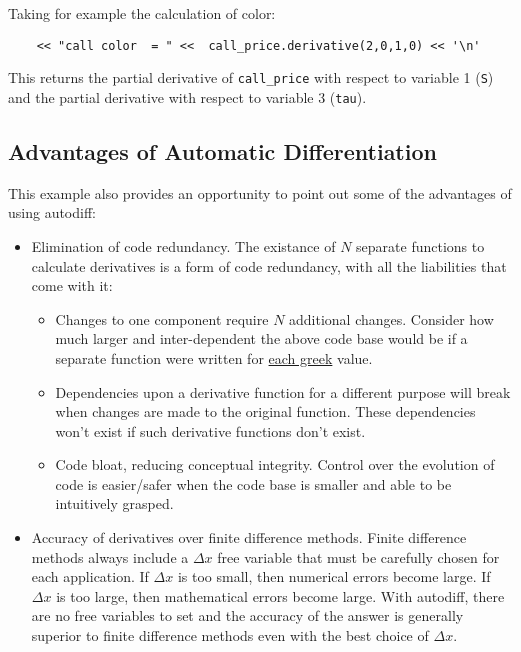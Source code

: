 \documentclass{article}
\begin{document}
Taking for example the calculation of color:

\begin{verbatim}
    << "call color  = " <<  call_price.derivative(2,0,1,0) << '\n'
\end{verbatim}
This returns the  partial derivative of {\tt call\_price} with respect to variable 1 ({\tt S})
and the  partial derivative with respect to variable 3 ({\tt tau}).

\subsection{Advantages of Automatic Differentiation}
This example also provides an opportunity to point out some of the advantages of using autodiff:
\begin{itemize}
\item Elimination of code redundancy. The existance of $N$ separate functions to calculate derivatives is a form
  of code redundancy, with all the liabilities that come with it:
  \begin{itemize}
    \item Changes to one component require $N$ additional changes. Consider how much larger and inter-dependent
        the above code base would be if a separate function were written for
        \href{https://en.wikipedia.org/wiki/Greeks_(finance)#Formulas_for_European_option_Greeks}{each greek} value.
    \item Dependencies upon a derivative function for a different purpose will break when changes are made to
        the original function. These dependencies won't exist if such derivative functions don't exist.
    \item Code bloat, reducing conceptual integrity. Control over the evolution of code is easier/safer when
        the code base is smaller and able to be intuitively grasped.
  \end{itemize}
\item Accuracy of derivatives over finite difference methods. Finite difference methods always include a
   $\Delta x$ free variable that must be carefully chosen for each application. If $\Delta x$ is too small, then
   numerical errors become large. If $\Delta x$ is too large, then mathematical errors become large.  With autodiff,
   there are no free variables to set and the accuracy of the answer is generally superior to finite difference
   methods even with the best choice of $\Delta x$.
\end{itemize}
\end{document}
